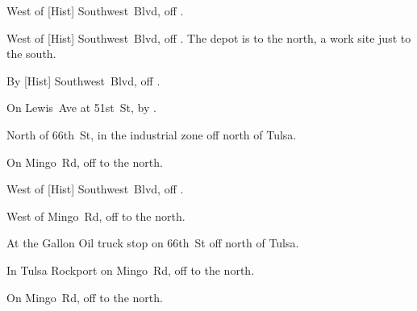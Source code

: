 
\begin{LocationList}

\Location{\GarageHQ \Garage}
West of [Hist] Southwest~Blvd, off  .

West of [Hist] Southwest~Blvd, off  .
The depot is to the north, a work site just to the south.

By [Hist] Southwest~Blvd, off  .

On Lewis~Ave at 51st~St, by  .

North of 66th~St, in the industrial zone off  north of Tulsa.

On Mingo~Rd, off  to the north.

West of [Hist] Southwest~Blvd, off  .

West of Mingo~Rd, off  to the north.

At the Gallon Oil truck stop on 66th~St off  north of Tulsa.

In Tulsa Rockport on Mingo~Rd, off  to the north.

On Mingo~Rd, off  to the north.

\end{LocationList}

